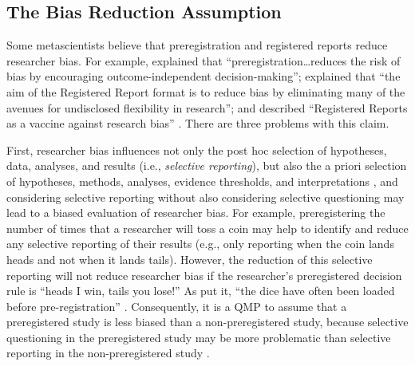 \documentclass[authordate, meta]{jote-new-article}
\begin{document}
\newpage
\subsection{The Bias Reduction Assumption}



Some metascientists believe that preregistration and registered reports reduce researcher bias. For example, \textcite[p. 15]{Hardwicke2023} explained that “preregistration…reduces the risk of bias by encouraging outcome-independent decision-making”; \textcite[p. 166]{Vazire2022} explained that “the aim of the Registered Report format is to reduce bias by eliminating many of the avenues for undisclosed flexibility in research”; and \textcite{Chambers2018} described “Registered Reports as a vaccine against research bias” \parencites[see also][p. 32]{Chambers2022}[p. 2]{Scheel2021}[for commentary, see][]{Field2021}. There are three problems with this claim.



First, researcher bias influences not only the post hoc selection of hypotheses, data, analyses, and results (i.e., \emph{selective reporting}), but also the a priori selection of hypotheses, methods, analyses, evidence thresholds, and interpretations \parencites[i.e., \emph{selective questioning};][]{Rubin2022a}, and considering selective reporting without also considering selective questioning may lead to a biased evaluation of researcher bias. For example, preregistering the number of times that a researcher will toss a coin may help to identify and reduce any selective reporting of their results (e.g., only reporting when the coin lands heads and not when it lands tails). However, the reduction of this selective reporting will not reduce researcher bias if the researcher’s preregistered decision rule is “heads I win, tails you lose!” As \textcite{Clark2022} put it, “the dice have often been loaded before pre-registration” \parencites[p. 13, see also][]{Dellsén2020}{Jamieson2023}. Consequently, it is a QMP to assume that a preregistered study is less biased than a non-preregistered study, because selective questioning in the preregistered study may be more problematic than selective reporting in the non-preregistered study \parencites[for similar concerns, see][p. 16]{Devezer2021}[p. 698]{Freiling2021}{Jamieson2023}{McDermott2022}{Oberauer2019}[p. 167]{Pham2021}{Rubin2022a}[p. 95]{Szollosi2020}[p. 212]{Wiggins2019}.
\end{document}

